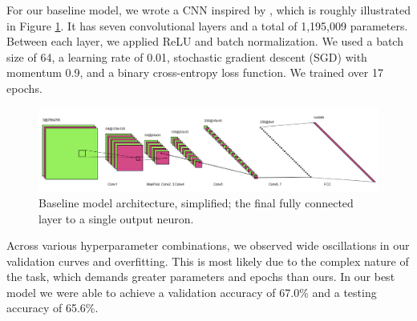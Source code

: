 \documentclass{article} %
\begin{document}
For our baseline model, we wrote a CNN inspired by \citet{wang2020cnngeneratedimagessurprisinglyeasy}, which is roughly illustrated in Figure \ref{fig:baseline_arch}. It has seven convolutional layers and a total of 1,195,009 parameters. Between each layer, we applied ReLU and batch normalization. We used a batch size of 64, a learning rate of 0.01, stochastic gradient descent (SGD) with momentum 0.9, and a binary cross-entropy loss function. We trained over 17 epochs.

\begin{figure}[h]
    \begin{center}
        \includegraphics[scale=0.45]{figs/baseline.png}
    \end{center}
    \caption{Baseline model architecture, simplified; the final fully connected layer to a single output neuron.}
    \label{fig:baseline_arch}
\end{figure}

Across various hyperparameter combinations, we observed wide oscillations in our validation curves and overfitting. This is most likely due to the complex nature of the task, which demands greater parameters and epochs than ours. In our best model we were able to achieve a validation accuracy of 67.0\% and a testing accuracy of 65.6\%.

\end{document}
